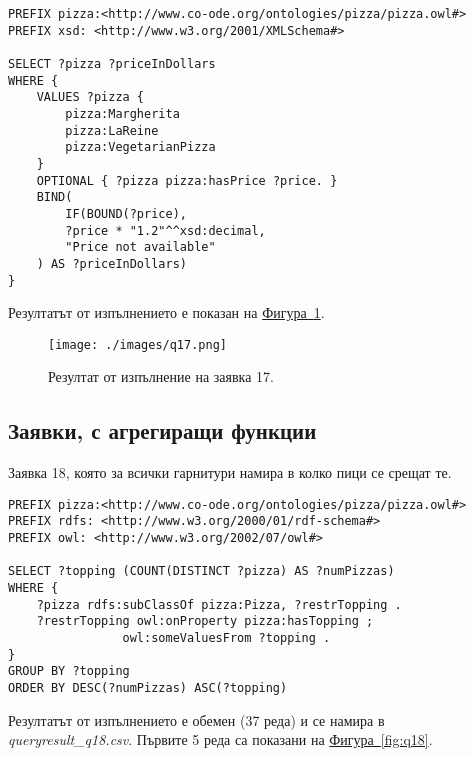 \documentclass[12pt]{article}
\begin{document}
        \begin{lstlisting}[language=SPARQL,style=sparql]
PREFIX pizza:<http://www.co-ode.org/ontologies/pizza/pizza.owl#>
PREFIX xsd: <http://www.w3.org/2001/XMLSchema#>

SELECT ?pizza ?priceInDollars
WHERE {
    VALUES ?pizza {
        pizza:Margherita
        pizza:LaReine
        pizza:VegetarianPizza
    }
    OPTIONAL { ?pizza pizza:hasPrice ?price. }
    BIND(
        IF(BOUND(?price),
        ?price * "1.2"^^xsd:decimal,
        "Price not available"
    ) AS ?priceInDollars)
}\end{lstlisting}

        Резултатът от изпълнението е показан на \hyperref[fig:q17]{Фигура~\ref*{fig:q17}}.

        \begin{center}
            \begin{figure}
            \centering
                \texttt{[image: ./images/q17.png]}
                \caption{Резултат от изпълнение на заявка 17.}
                \label{fig:q17}
            \end{figure}
        \end{center}
            
\clearpage
\pagebreak

    \subsection{Заявки, с агрегиращи функции}
        
        Заявка 18, която за всички гарнитури намира в колко пици се срещат те.

        \begin{lstlisting}[language=SPARQL,style=sparql]
PREFIX pizza:<http://www.co-ode.org/ontologies/pizza/pizza.owl#>
PREFIX rdfs: <http://www.w3.org/2000/01/rdf-schema#>
PREFIX owl: <http://www.w3.org/2002/07/owl#>

SELECT ?topping (COUNT(DISTINCT ?pizza) AS ?numPizzas)
WHERE {
    ?pizza rdfs:subClassOf pizza:Pizza, ?restrTopping .
    ?restrTopping owl:onProperty pizza:hasTopping ;
                owl:someValuesFrom ?topping .
}
GROUP BY ?topping
ORDER BY DESC(?numPizzas) ASC(?topping)\end{lstlisting}

        Резултатът от изпълнението е обемен (37 реда) и се намира в \textit{query\-result\_q18.csv}. Първите 5 реда са показани на \hyperref[fig:q18]{Фигура~\ref*{fig:q18}}.
\end{document}
